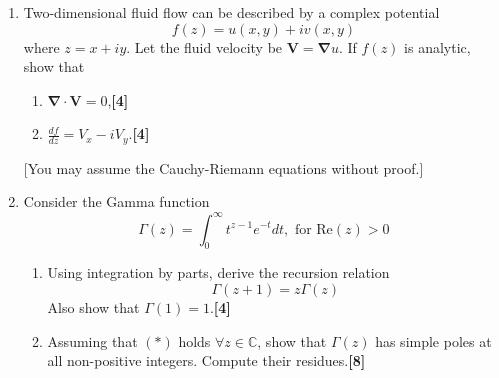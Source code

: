 \documentclass[a4paper]{article}
\begin{document}
\begin{qns}\leavevmode
\begin{enumerate}[label=(\roman*)]
\item Two-dimensional fluid flow can be described by a complex potential
$$f(z)=u(x,y)+iv(x,y)$$
where $z=x+iy$. Let the fluid velocity be $\mathbf{V}=\boldsymbol{\nabla}u$. If $f(z)$ is analytic, show that
\begin{enumerate}[label=(\alph*)]
\item  $\boldsymbol{\nabla}\cdot\mathbf{V}=0$,\hfill \textbf{[4]}
\item $\frac{df}{dz}=V_x-iV_y$.\hfill \textbf{[4]}
\end{enumerate}
[You may assume the Cauchy-Riemann equations without proof.]
\item Consider the Gamma function
$$\Gamma(z)=\int_0^\infty t^{z-1}e^{-t}dt, \text{ for }\text{Re}(z)>0$$
\begin{enumerate}[label=(\alph*)]
\item Using integration by parts, derive the recursion relation 
\begin{equation}
    \Gamma(z+1)=z\Gamma(z)\tag{*}
\end{equation}
Also show that $\Gamma(1)=1$.\hfill \textbf{[4]}
\item Assuming that $(*)$ holds $\forall z\in\mathbb{C}$, show that $\Gamma(z)$ has simple poles at all non-positive integers. Compute their residues.\hfill \textbf{[8]}
\end{enumerate}
\end{enumerate}
\end{qns}
\end{document}
